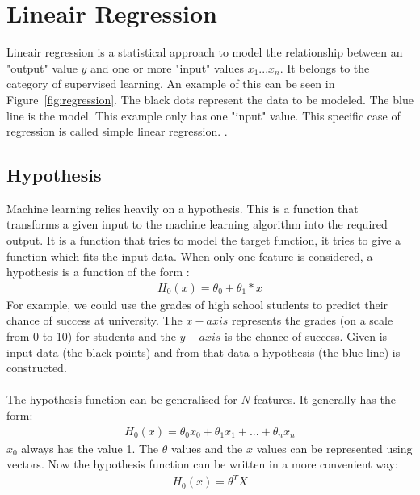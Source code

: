 \section{Lineair Regression}
\label{regression}
Lineair regression is a statistical approach to model the relationship between an "output" value $y$ and one or more "input" values $x_1...x_n$. It belongs to the category of supervised learning. An example of this can be seen in Figure~\ref{fig:regression}. The black dots represent the data to be modeled. The blue line is the model. This example only has one "input" value. This specific case of regression is called simple linear regression. \cite{scikit-regression}. 

\subsection{Hypothesis}
Machine learning relies heavily on a hypothesis. This is a function that transforms a given input to the machine learning algorithm into the required output. It is a function that tries to model the target function, it tries to give a function which fits the input data.  When only one feature is considered, a hypothesis is a function of the form \cite{stanford}: 
\begin{align}
H_0(x) = \theta_0 + \theta_1 * x 
\end{align}
For example, we could use the grades of high school students to predict their chance of success at university. The $x-axis$ represents the grades (on a scale from 0 to 10) for students and the $y-axis$ is the chance of success. Given is input data (the black points) and from that data a hypothesis (the blue line) is constructed. \\\\
The hypothesis function can be generalised for $N$ features. It generally has the form:
\begin{align}
H_0(x) = \theta_0x_0 + \theta_1x_1 + ... + \theta_nx_n
\end{align}
$x_0$ always has the value 1. The $\theta$ values and the $x$ values can be represented using vectors. Now the hypothesis function can be written in a more convenient way:
\begin{align}
\label{hypothesisfunc}
H_0(x) = \theta^TX
\end{align}

